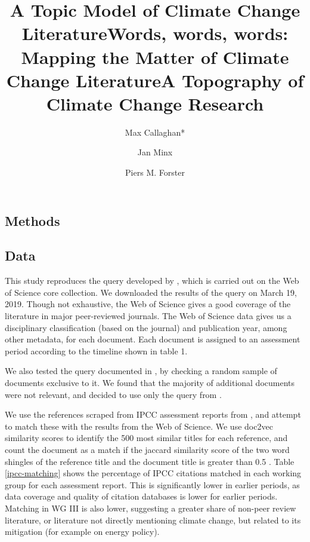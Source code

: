 \documentclass{article}
\makeatletter
\renewcommand{\maketitle}{\bgroup\setlength{\parindent}{0pt}
	\begin{flushleft}
		
		{\huge\textbf{\@title}}
		
		\bigskip
		
		{\large\textbf{\@author}}
		
		\bigskip
		
		{\large{ \@date}}
		
	\end{flushleft}\egroup
}
\makeatother
\begin{document}
	\title{A Topic Model of Climate Change Literature}
	\title{Words, words, words: Mapping the Matter of Climate Change Literature}
	\title{A Topography of Climate Change Research}
	
\author[1,2]{Max Callaghan*}
\author[1,2]{Jan Minx}
\author[2]{Piers M. Forster}

	\maketitle
	\begin{linenumbers}
		

		
		
		\section*{Methods}
		
					\setcounter{table}{0}
		\renewcommand\thetable{SI.\arabic{table}}  
		
		\subsection*{Data}
		
		This study reproduces the query developed by \citep{Grieneisen2011}, which is carried out on the Web of Science core collection. We downloaded the results of the query on March 19, 2019. Though not exhaustive, the Web of Science gives a good coverage of the literature in major peer-reviewed journals. The Web of Science data gives us a disciplinary classification (based on the journal) and publication year, among other metadata, for each document.	Each document is assigned to an assessment period according to the timeline shown in table 1.
		
		We also tested the query documented in \cite{Haunschild2016}, by checking a random sample of documents exclusive to it. We found that the majority of additional documents were not relevant, and decided to use only the query from \cite{Grieneisen2011}.
		
		We use the references scraped from IPCC assessment reports from \citep{Minx2017l}, and attempt to match these with the results from the Web of Science. We use doc2vec similarity scores \cite{Le2014} to identify the 500 most similar titles for each reference, and count the document as a match if the jaccard similarity score of the two word shingles of the reference title and the document title is greater than 0.5 \cite{Khabsa2014}. Table \ref{ipcc-matching} shows the percentage of IPCC citations matched in each working group for each assessment report. This is significantly lower in earlier periods, as data coverage and quality of citation databases is lower for earlier periods. Matching in WG III is also lower, suggesting a greater share of non-peer review literature, or literature not directly mentioning climate change, but related to its mitigation (for example on energy policy).
		

\end{linenumbers}
\end{document}

